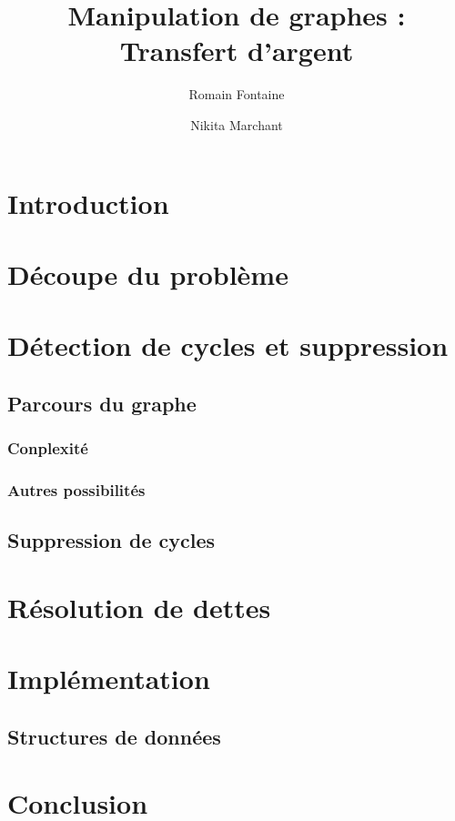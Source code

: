 \documentclass[12pt, oneside]{article}
\title{Manipulation de graphes :\\ Transfert d’argent}
\author{Romain Fontaine \and Nikita Marchant}
\begin{document}
\maketitle

\section{Introduction}

\section{Découpe du problème}

\section{Détection de cycles et suppression}
\subsection{Parcours du graphe}
\subsubsection{Conplexité}
\subsubsection{Autres possibilités}

\subsection{Suppression de cycles}

\section{Résolution de dettes}

\section{Implémentation}
\subsection{Structures de données}


\section{Conclusion}
\end{document}
